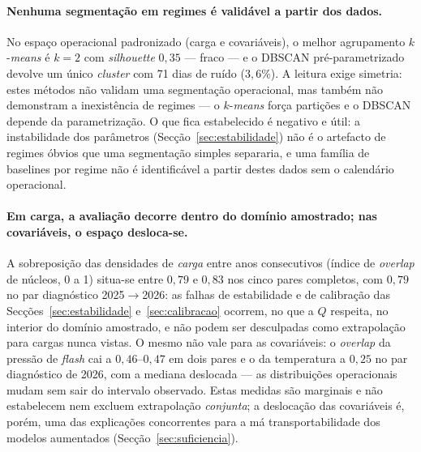 \paragraph{Nenhuma segmentação em regimes é validável a partir dos dados.} No espaço operacional padronizado (carga e covariáveis), o melhor
agrupamento $k$-\emph{means} é $k{=}2$ com \emph{silhouette} $0{,}35$ ---
fraco --- e o DBSCAN pré-parametrizado devolve um único \emph{cluster} com 71
dias de ruído ($3{,}6\%$). A leitura exige simetria: estes métodos não
validam uma segmentação operacional, mas também não demonstram a inexistência
de regimes --- o $k$-\emph{means} força partições e o DBSCAN depende da
parametrização. O que fica estabelecido é negativo e útil: a instabilidade
dos parâmetros (Secção~\ref{sec:estabilidade}) não é o artefacto de
regimes óbvios que uma segmentação simples separaria, e uma família de
baselines por regime não é identificável a partir destes dados sem o
calendário operacional.

\paragraph{Em carga, a avaliação decorre dentro do domínio amostrado; nas
covariáveis, o espaço desloca-se.} A sobreposição das densidades de
\emph{carga} entre anos consecutivos (índice de \emph{overlap} de núcleos, 0
a 1) situa-se entre $0{,}79$ e $0{,}83$ nos cinco pares completos, com
$0{,}79$ no par diagnóstico 2025${\to}$2026: as falhas de estabilidade e de
calibração das Secções~\ref{sec:estabilidade} e~\ref{sec:calibracao}
ocorrem, no que a $Q$ respeita, no interior do domínio amostrado, e não podem
ser desculpadas como extrapolação para cargas nunca vistas. O mesmo não vale
para as covariáveis: o \emph{overlap} da pressão de \emph{flash} cai a
$0{,}46$--$0{,}47$ em dois pares e o da temperatura a $0{,}25$ no par
diagnóstico de 2026, com a mediana deslocada --- as distribuições
operacionais mudam sem sair do intervalo observado. Estas medidas são
marginais e não estabelecem nem excluem extrapolação \emph{conjunta}; a
deslocação das covariáveis é, porém, uma das explicações concorrentes para a
má transportabilidade dos modelos aumentados
(Secção~\ref{sec:suficiencia}).

